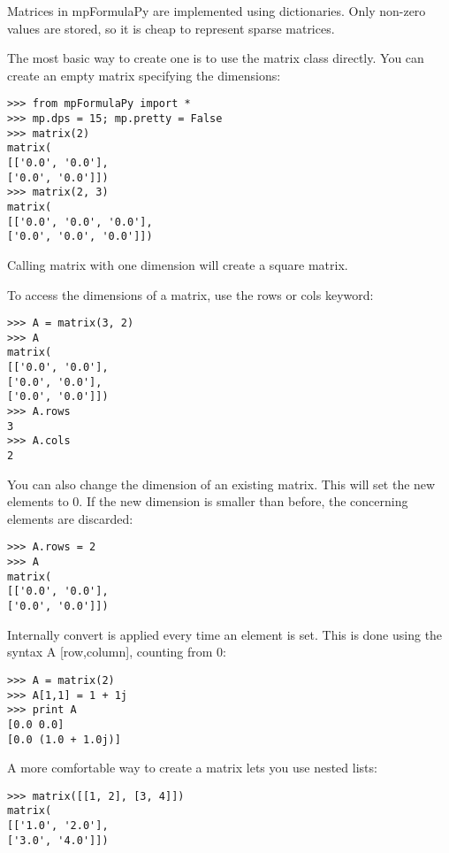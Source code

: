 Matrices in mpFormulaPy are implemented using dictionaries. Only non-zero values are stored, so it is cheap to represent sparse matrices.

The most basic way to create one is to use the matrix class directly. You can create an empty matrix specifying the dimensions:

\begin{lstlisting}
>>> from mpFormulaPy import *
>>> mp.dps = 15; mp.pretty = False
>>> matrix(2)
matrix(
[['0.0', '0.0'],
['0.0', '0.0']])
>>> matrix(2, 3)
matrix(
[['0.0', '0.0', '0.0'],
['0.0', '0.0', '0.0']])
\end{lstlisting}


Calling matrix with one dimension will create a square matrix.

To access the dimensions of a matrix, use the rows or cols keyword:

\begin{lstlisting}
>>> A = matrix(3, 2)
>>> A
matrix(
[['0.0', '0.0'],
['0.0', '0.0'],
['0.0', '0.0']])
>>> A.rows
3
>>> A.cols
2
\end{lstlisting}

You can also change the dimension of an existing matrix. This will set the new elements to 0. If the new dimension is smaller than before, the concerning elements are discarded:

\begin{lstlisting}
>>> A.rows = 2
>>> A
matrix(
[['0.0', '0.0'],
['0.0', '0.0']])
\end{lstlisting}

Internally convert is applied every time an element is set. This is done using the syntax A [row,column], counting from 0:

\begin{lstlisting}
>>> A = matrix(2)
>>> A[1,1] = 1 + 1j
>>> print A
[0.0 0.0]
[0.0 (1.0 + 1.0j)]
\end{lstlisting}

A more comfortable way to create a matrix lets you use nested lists:

\begin{lstlisting}
>>> matrix([[1, 2], [3, 4]])
matrix(
[['1.0', '2.0'],
['3.0', '4.0']])
\end{lstlisting}


%
%

